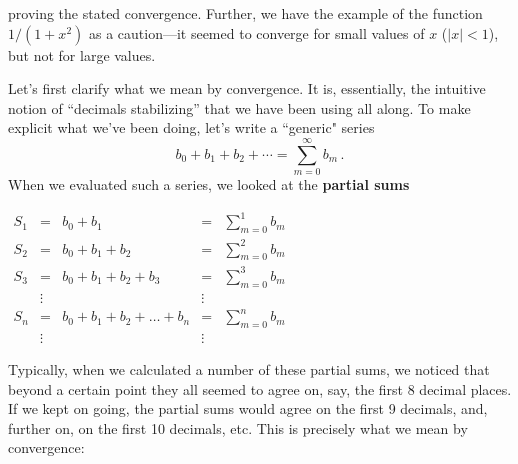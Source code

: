 {{{{\newpage
\noindent
proving the stated convergence.  Further, we have the example of the function $1/(1+x^2)$ as a caution---it seemed to converge for small values of $x$ ($|x|<1$), but not for large values.

Let's first clarify what we mean by convergence.  It is,
essentially, the intuitive notion of ``decimals stabilizing'' that we have been using all along.  To make explicit what we've been doing, let's write a ``generic" series 
\[
b_0 + b_1 + b_2 + \cdots = \sum_{m=0}^\infty b_m \, .
\] 
When we evaluated such a series, we looked at the {\bf partial sums}

\vspace{10 pt}
$\begin{array}{lclcl}
S_1&=&b_0 + b_1 &=&{\displaystyle \sum_{m=0}^1 b_m}\\ [.18in]
S_2&=&b_0 + b_1+b_2 &=&{\displaystyle\sum_{m=0}^2 b_m}\\ [.18in]
S_3&=&b_0 + b_1 + b_2 +b_3&=&{\displaystyle\sum_{m=0}^3 b_m} \\ [.18in]
&\vdots & &\vdots &  \\
S_n&=&b_0 + b_1 + b_2 + \ldots+b_n&=&{\displaystyle\sum_{m=0}^n b_m} \\
&\vdots&&\vdots & 
\end{array}$

\medskip
Typically, when we calculated a number of these partial sums, we noticed that beyond a certain point they all seemed to agree on, say, the first 8 decimal places.  If we kept on going, the partial sums would agree on the first 9 decimals, and, further on, on the first 10 decimals, etc. This is precisely what we mean by convergence: 

\medskip
\noindent
\begin{center}
\end{center}}}}}
